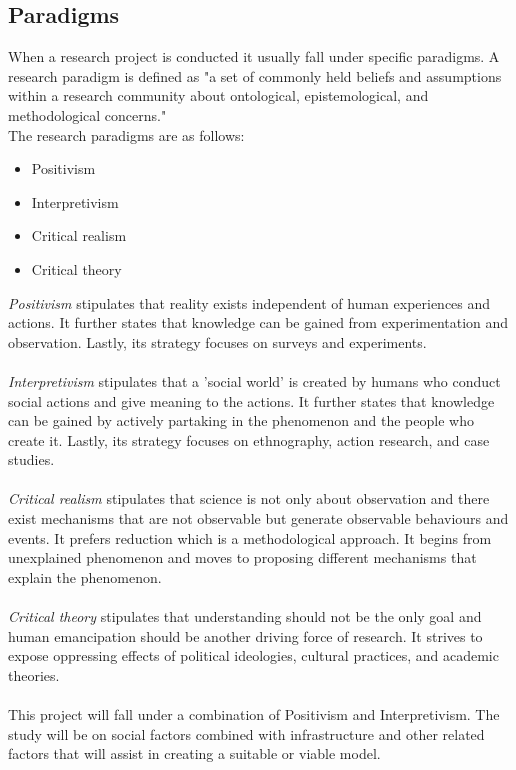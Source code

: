 \subsection{Paradigms}
When a research project is conducted it usually fall under specific paradigms. A research paradigm is defined as "a set of commonly held beliefs and assumptions within a research community about ontological, epistemological, and methodological concerns."\cite{des}\\
The research paradigms are as follows:
\begin{itemize}
\item Positivism
\item Interpretivism
\item Critical realism
\item Critical theory
\end{itemize}
\textit{Positivism} stipulates that reality exists independent of human experiences and actions. It further states that knowledge can be gained from experimentation and observation. Lastly, its strategy focuses on surveys and experiments.\\\\
\textit{Interpretivism} stipulates that a 'social world' is created by humans who conduct social actions and give meaning to the actions. It further states that knowledge can be gained by actively partaking in the phenomenon and the people who create it. Lastly, its strategy focuses on ethnography, action research, and case studies.\\\\
\textit{Critical realism} stipulates that science is not only about observation and there exist mechanisms that are not observable but generate observable behaviours and events. It prefers reduction which is a methodological approach. It begins from unexplained phenomenon and moves to proposing different mechanisms that explain the phenomenon.\\\\
\textit{Critical theory} stipulates that understanding should not be the only goal and human emancipation should be another driving force of research. It strives to expose oppressing effects of political ideologies, cultural practices, and academic theories.\\\\
This project will fall under a combination of Positivism and Interpretivism. The study will be on social factors combined with infrastructure and other related factors that will assist in creating a suitable or viable model.
